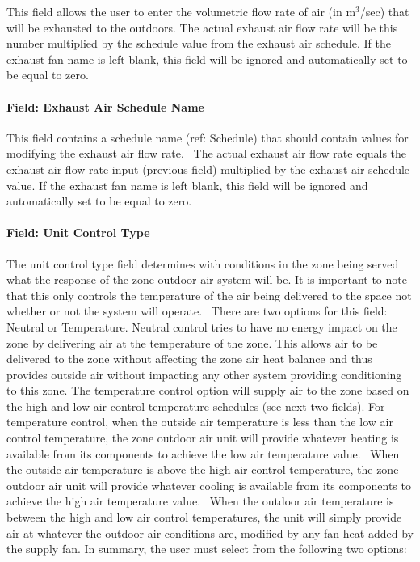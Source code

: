 This field allows the user to enter the volumetric flow rate of air (in m\(^{3}\)/sec) that will be exhausted to the outdoors. The actual exhaust air flow rate will be this number multiplied by the schedule value from the exhaust air schedule. If the exhaust fan name is left blank, this field will be ignored and automatically set to be equal to zero.

\paragraph{Field: Exhaust Air Schedule Name}\label{field-exhaust-air-schedule-name}

This field contains a schedule name (ref: Schedule) that should contain values for modifying the exhaust air flow rate.~ The actual exhaust air flow rate equals the exhaust air flow rate input (previous field) multiplied by the exhaust air schedule value. If the exhaust fan name is left blank, this field will be ignored and automatically set to be equal to zero.

\paragraph{Field: Unit Control Type}\label{field-unit-control-type}

The unit control type field determines with conditions in the zone being served what the response of the zone outdoor air system will be. It is important to note that this only controls the temperature of the air being delivered to the space not whether or not the system will operate.~ There are two options for this field: Neutral or Temperature. Neutral control tries to have no energy impact on the zone by delivering air at the temperature of the zone. This allows air to be delivered to the zone without affecting the zone air heat balance and thus provides outside air without impacting any other system providing conditioning to this zone. The temperature control option will supply air to the zone based on the high and low air control temperature schedules (see next two fields). For temperature control, when the outside air temperature is less than the low air control temperature, the zone outdoor air unit will provide whatever heating is available from its components to achieve the low air temperature value.~ When the outside air temperature is above the high air control temperature, the zone outdoor air unit will provide whatever cooling is available from its components to achieve the high air temperature value.~ When the outdoor air temperature is between the high and low air control temperatures, the unit will simply provide air at whatever the outdoor air conditions are, modified by any fan heat added by the supply fan. In summary, the user must select from the following two options:

